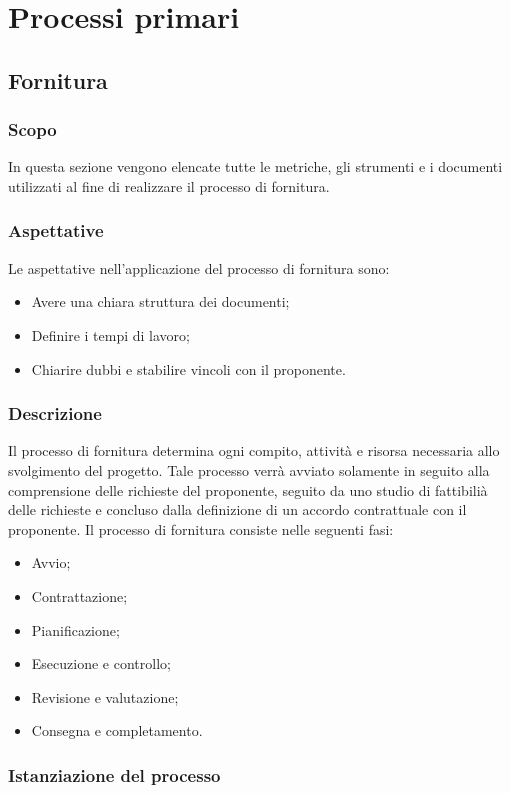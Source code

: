 
\section{Processi primari}\label{section:Processi_primari}
\subsection{Fornitura} \label{subsection:Fornitura}
\subsubsection{Scopo}\label{subsubsection: scopo_fornitura}
In questa sezione vengono elencate tutte le metriche, gli strumenti e i documenti utilizzati al fine di realizzare il processo di fornitura.
\subsubsection{Aspettative}\label{subsubsection: aspettative_fornitura}
Le aspettative nell'applicazione del processo di fornitura sono:
\begin {itemize}
\item Avere una chiara struttura dei documenti;
\item Definire i tempi di lavoro;
\item Chiarire dubbi e stabilire vincoli con il proponente.
\end {itemize}
\subsubsection{Descrizione}\label{subsubsection: descrizione_fornitura}
Il processo di fornitura determina ogni compito, attività e risorsa necessaria allo svolgimento del progetto.
Tale processo verrà avviato solamente in seguito alla comprensione delle richieste del proponente, seguito da uno studio di fattibilià delle richieste e concluso dalla definizione di un accordo contrattuale con il proponente.
Il processo di fornitura consiste nelle seguenti fasi:
\begin {itemize}
\item Avvio;
\item Contrattazione;
\item Pianificazione;
\item Esecuzione e controllo;
\item Revisione e valutazione;
\item Consegna e completamento.
\end {itemize}
\subsubsection{Istanziazione del processo}
